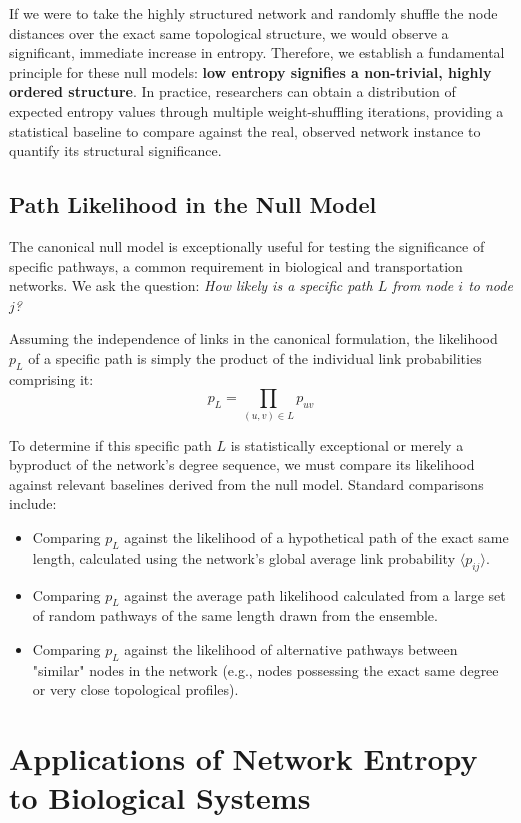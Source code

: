 If we were to take the highly structured network and randomly shuffle the node distances over the exact same topological structure, we would observe a significant, immediate increase in entropy. Therefore, we establish a fundamental principle for these null models: \textbf{low entropy signifies a non-trivial, highly ordered structure}. In practice, researchers can obtain a distribution of expected entropy values through multiple weight-shuffling iterations, providing a statistical baseline to compare against the real, observed network instance to quantify its structural significance.

\subsection{Path Likelihood in the Null Model}
\label{subsec:path_likelihood}

The canonical null model is exceptionally useful for testing the significance of specific pathways, a common requirement in biological and transportation networks. We ask the question: \textit{How likely is a specific path \(L\) from node \(i\) to node \(j\)?}

Assuming the independence of links in the canonical formulation, the likelihood \(p_L\) of a specific path is simply the product of the individual link probabilities comprising it:
\[
    p_L = \prod_{(u,v) \in L} p_{uv}
\]

To determine if this specific path \(L\) is statistically exceptional or merely a byproduct of the network's degree sequence, we must compare its likelihood against relevant baselines derived from the null model. Standard comparisons include:
\begin{itemize}
    \item Comparing \(p_L\) against the likelihood of a hypothetical path of the exact same length, calculated using the network's global average link probability \(\langle p_{ij} \rangle\).
    \item Comparing \(p_L\) against the average path likelihood calculated from a large set of random pathways of the same length drawn from the ensemble.
    \item Comparing \(p_L\) against the likelihood of alternative pathways between "similar" nodes in the network (e.g., nodes possessing the exact same degree or very close topological profiles).
\end{itemize}

\section{Applications of Network Entropy to Biological Systems}
\label{sec:applications_network_entropy_biology}

